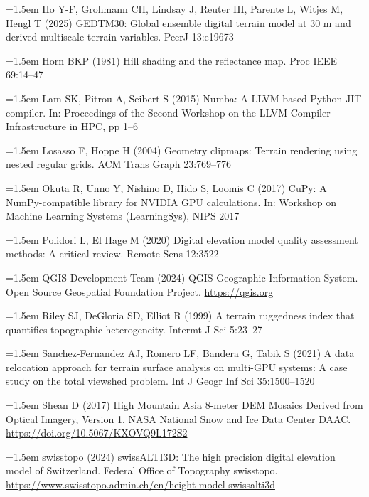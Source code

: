 \documentclass[10pt,a4paper]{article}
\begin{document}
\noindent\hangindent=1.5em Ho Y-F, Grohmann CH, Lindsay J, Reuter HI, Parente L, Witjes M, Hengl T (2025) GEDTM30: Global ensemble digital terrain model at 30 m and derived multiscale terrain variables. PeerJ 13:e19673\par
\noindent\hangindent=1.5em Horn BKP (1981) Hill shading and the reflectance map. Proc IEEE 69:14--47\par
\noindent\hangindent=1.5em Lam SK, Pitrou A, Seibert S (2015) Numba: A LLVM-based Python JIT compiler. In: Proceedings of the Second Workshop on the LLVM Compiler Infrastructure in HPC, pp 1--6\par
\noindent\hangindent=1.5em Losasso F, Hoppe H (2004) Geometry clipmaps: Terrain rendering using nested regular grids. ACM Trans Graph 23:769--776\par
\noindent\hangindent=1.5em Okuta R, Unno Y, Nishino D, Hido S, Loomis C (2017) CuPy: A NumPy-compatible library for NVIDIA GPU calculations. In: Workshop on Machine Learning Systems (LearningSys), NIPS 2017\par
\noindent\hangindent=1.5em Polidori L, El Hage M (2020) Digital elevation model quality assessment methods: A critical review. Remote Sens 12:3522\par
\noindent\hangindent=1.5em QGIS Development Team (2024) QGIS Geographic Information System. Open Source Geospatial Foundation Project. \url{https://qgis.org}\par
\noindent\hangindent=1.5em Riley SJ, DeGloria SD, Elliot R (1999) A terrain ruggedness index that quantifies topographic heterogeneity. Intermt J Sci 5:23--27\par
\noindent\hangindent=1.5em Sanchez-Fernandez AJ, Romero LF, Bandera G, Tabik S (2021) A data relocation approach for terrain surface analysis on multi-GPU systems: A case study on the total viewshed problem. Int J Geogr Inf Sci 35:1500--1520\par
\noindent\hangindent=1.5em Shean D (2017) High Mountain Asia 8-meter DEM Mosaics Derived from Optical Imagery, Version 1. NASA National Snow and Ice Data Center DAAC. \url{https://doi.org/10.5067/KXOVQ9L172S2}\par
\noindent\hangindent=1.5em swisstopo (2024) swissALTI3D: The high precision digital elevation model of Switzerland. Federal Office of Topography swisstopo. \url{https://www.swisstopo.admin.ch/en/height-model-swissalti3d}\par
\end{document}
